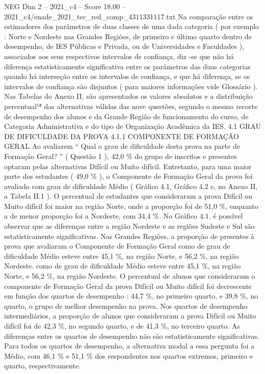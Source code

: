 \begin{textsample}{NEG Dim 2 – 2021\_c4 – Score 18.00 – 2021\_c4/enade\_2021\_tec\_red\_comp\_4311331117.txt}
Na comparação entre os estimadores dos parâmetros de duas classes de uma dada categoria ( por exemplo : Norte e Nordeste nas Grandes Regiões, de primeiro e último quarto dentro de desempenho, de IES Públicas e Privada, ou de Universidades e Faculdades ), associados aos seus respectivos intervalos de confiança, diz -se que não há diferença estatisticamente significativa entre os parâmetros das duas categorias quando há interseção entre os intervalos de confiança, e que há diferença, se os intervalos de confiança são disjuntos ( para maiores informações vide Glossário ).
Nas Tabelas do Anexo II, são apresentados os valores absolutos e a distribuição percentual¹⁸ das alternativas válidas das nove questões, segundo o mesmo recorte de desempenho dos alunos e da Grande Região de funcionamento do curso, de Categoria Administrativa e do tipo de Organização Acadêmica da IES. 4.1 GRAU DE DIFICULDADE DA PROVA 4.1.1 COMPONENTE DE FORMAÇÃO GERAL Ao avaliarem “ Qual o grau de dificuldade desta prova na parte de Formação Geral? ” ( Questão 1 ), 42,0 \% do grupo de inscritos e presentes optaram pelas alternativas Difícil ou Muito difícil.
Entretanto, para uma maior parte dos estudantes ( 49,0 \% ), o Componente de Formação Geral da prova foi avaliado com grau de dificuldade Médio ( Gráfico 4.1, Gráfico 4.2 e, no Anexo II, a Tabela II.1 ).
O percentual de estudantes que consideraram a prova Difícil ou Muito difícil foi maior na região Norte, onde a proporção foi de 51,0 \%, enquanto a de menor proporção foi a Nordeste, com 34,4 \%.
No Gráfico 4.1, é possível observar que as diferenças entre a região Nordeste e as regiões Sudeste e Sul são estatisticamente significativas.
Nas Grandes Regiões, a proporção de presentes à prova que avaliaram o Componente de Formação Geral como de grau de dificuldade Médio esteve entre 45,1 \%, na região Norte, e 56,2 \%, na região Nordeste. como de grau de dificuldade Médio esteve entre 45,1 \%, na região Norte, e 56,2 \%, na região Nordeste.
O percentual de alunos que consideraram o componente de Formação Geral da prova Difícil ou Muito difícil foi decrescente em função dos quartos de desempenho : 44,7 \%, no primeiro quarto, e 39,8 \%, no quarto, o grupo de melhor desempenho na prova.
Nos quartos de desempenho intermediários, a proporção de alunos que consideraram a prova Difícil ou Muito difícil foi de 42,3 \%, no segundo quarto, e de 41,3 \%, no terceiro quarto.
As diferenças entre os quartos de desempenho não são estatisticamente significativas.
Para todos os quartos de desempenho, a alternativa modal a essa pergunta foi a Médio, com 46,1 \% e 51,1 \% dos respondentes nos quartos extremos, primeiro e quarto, respectivamente.

\end{textsample}
